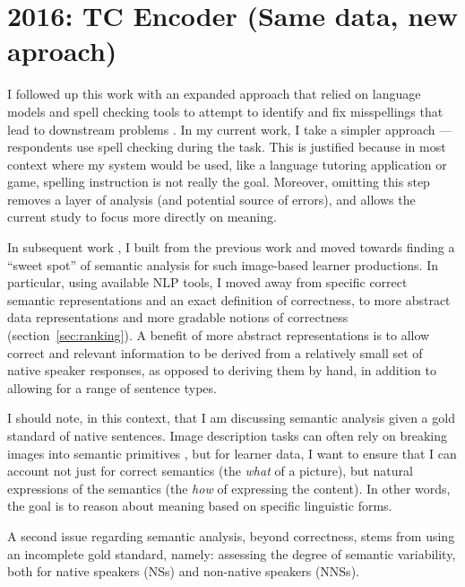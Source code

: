 

\section{2016: TC Encoder (Same data, new aproach)}
I followed up this work with an expanded approach that relied on language models and spell checking tools to attempt to identify and fix misspellings that lead to downstream problems \citep{king:dickinson:14}. In my current work, I take a simpler approach --- respondents use spell checking during the task. This is justified because in most context where my system would be used, like a language tutoring application or game, spelling instruction is not really the goal. Moreover, omitting this step removes a layer of analysis (and potential source of errors), and allows the current study to focus more directly on meaning.


In subsequent work \citep{king:dickinson:16}, I built from the previous work \citep{king:dickinson:13, king:dickinson:14} and moved towards finding a ``sweet spot'' of
semantic analysis \citep[cf.][]{bailey:meurers:08} for such
image-based learner productions.
In particular, using available NLP tools,
I moved away from specific correct semantic representations and an
exact definition of correctness, to more abstract data representations
and more gradable notions of correctness (section~\ref{sec:ranking}).
A benefit of more abstract representations is to allow correct
and relevant information to be derived from a relatively small set of
native speaker responses, as opposed to deriving them by hand, in
addition to allowing for a range of sentence types.

I should note, in this context, that I am discussing semantic
analysis given a gold standard of native sentences.  Image description
tasks can often rely on breaking images into semantic primitives
\citep[see, e.g.,][and references therein]{ortiz:wolff:lapata:15}, but
for learner data, I want to ensure that I can account not just for
correct semantics (the \emph{what} of a picture), but natural
expressions of the semantics (the \emph{how} of expressing the
content).  In other words, the goal is  to reason about meaning based on
specific linguistic forms.

A second issue regarding semantic analysis, beyond correctness, stems
from using an incomplete gold standard, namely: assessing the degree
of semantic variability, both for native speakers (NSs) and non-native
speakers (NNSs).
 
